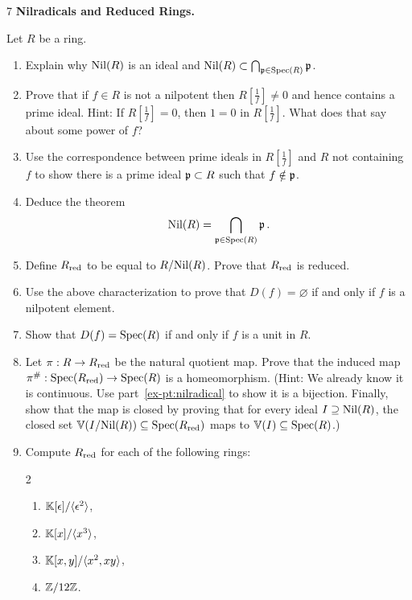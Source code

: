 \documentclass[Notebook.tex]{subfiles}
\begin{document}
\begin{problem}{7}
    \textbf{Nilradicals and Reduced Rings.} 
    
    Let $R$ be a ring. 
    \begin{enumerate}
        \item Explain why $\text{Nil}(R)$ is an ideal and $\text{Nil}(R)\subset \bigcap_{\operatorname{\mathfrak{p}}\in \operatorname{Spec}(R)}\operatorname{\mathfrak{p}}$.
        \item Prove that if $f \in R$ is not a nilpotent then $R[\frac{1}{f}] \neq 0$ and hence contains a prime ideal. Hint: If $R[\frac{1}{f}]=0$, then $1=0$ in $R[\frac{1}{f}]$. What does that say about some power of $f$?
        \item Use the correspondence between prime ideals in $R[\frac{1}{f}]$ and $R$ not containing $f$ to show there is a prime ideal $\operatorname{\mathfrak{p}}\subset R$ such that $f\notin \operatorname{\mathfrak{p}}$.
        \item\label{ex-pt:nilradical} Deduce the theorem
        \[
        \text{Nil}(R)=\bigcap_{\operatorname{\mathfrak{p}}\in \operatorname{Spec}(R)}\operatorname{\mathfrak{p}}. 
        \]
        \item Define $R_{\text{red}}$ to be equal to $R/\text{Nil}(R)$. Prove that $R_{\text{red}}$ is reduced.
        \item Use the above characterization to prove that $D(f) = \varnothing$ if and only if $f$ is a nilpotent element. 
        \item Show that $D(f) = \operatorname{Spec}(R)$ if and only if $f$ is a unit in $R$. 
        \item Let $\pi:R \to R_{\text{red}}$ be the natural quotient map. Prove that the induced map $\pi^{\#}:\operatorname{Spec}(R_{\text{red}}) \to \operatorname{Spec}(R)$ is a homeomorphism. (Hint: We already know it is continuous. Use part~\ref{ex-pt:nilradical} to show it is a bijection. Finally, show that the map is closed by proving that for every ideal $I\supseteq \text{Nil}(R)$, the closed set $\mathbb V(I/\text{Nil}(R))\subseteq \operatorname{Spec}(R_{\text{red}})$ maps to $\mathbb V(I)\subseteq \operatorname{Spec}(R)$.)
        \item Compute $R_{\text{red}}$ for each of the following rings:
        \begin{multicols}{2}
        \begin{enumerate}
            \item $\mathbb K[\epsilon]/\langle \epsilon^2\rangle$,
            \item $\mathbb K[x]/\langle x^3\rangle$,
            \item $\mathbb K[x,y]/\langle x^2,xy\rangle$,
            \item $\mathbb Z/12\mathbb Z$.
        \end{enumerate}
        \end{multicols}
    \end{enumerate}
\end{problem}
\end{document}
